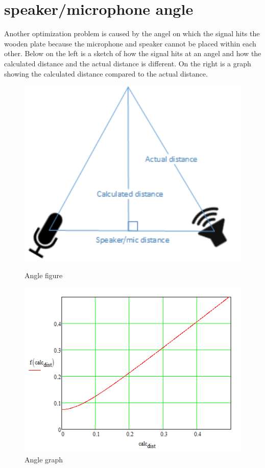 \section{speaker/microphone angle}
Another optimization problem is caused by the angel on which the signal hits the wooden plate because the microphone and speaker cannot be placed within each other. Below on the left is a sketch of how the signal hits at an angel and how the calculated distance and the actual distance is different. On the right is a graph showing the calculated distance compared to the actual distance.
\begin{figure}[H]
\begin{minipage}[b]{0.49\linewidth}
\centering
\includegraphics[width=1\textwidth]{billeder/angle_error}
\caption{Angle figure}
\end{minipage}
\hspace{0.5cm}
\begin{minipage}[b]{0.49\linewidth}
\centering
\includegraphics[width=1\textwidth]{billeder/angle_graph}
\caption{Angle graph}
\end{minipage}
\end{figure}
